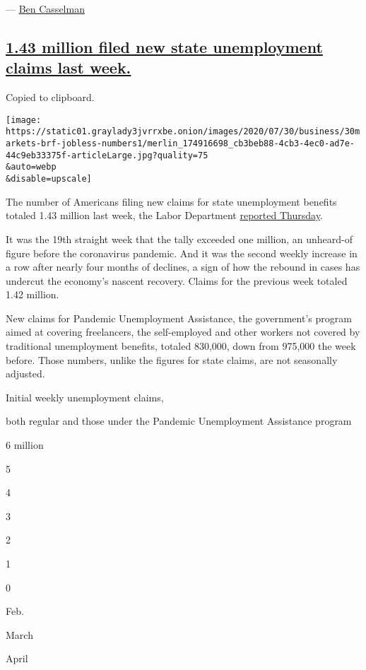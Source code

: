 --- \href{https://www.nytimes3xbfgragh.onion/by/ben-casselman}{Ben
Casselman}

\hypertarget{143-million-filed-new-state-unemployment-claims-last-week}{%
\subsection{\texorpdfstring{\protect\hyperlink{1-43-million-filed-new-state-unemployment-claims-last-week}{1.43
million filed new state unemployment claims last
week.}}{1.43 million filed new state unemployment claims last week.}}\label{143-million-filed-new-state-unemployment-claims-last-week}}

Copied to clipboard.

\texttt{[image: https://static01.graylady3jvrrxbe.onion/images/2020/07/30/business/30markets-brf-jobless-numbers1/merlin\_174916698\_cb3beb88-4cb3-4ec0-ad7e-44c9eb33375f-articleLarge.jpg?quality=75\\\&auto=webp\\\&disable=upscale]}

The number of Americans filing new claims for state unemployment
benefits totaled 1.43 million last week, the Labor Department
\href{https://oui.doleta.gov/press/2020/073020.pdf}{reported Thursday}.

It was the 19th straight week that the tally exceeded one million, an
unheard-of figure before the coronavirus pandemic. And it was the second
weekly increase in a row after nearly four months of declines, a sign of
how the rebound in cases has undercut the economy's nascent recovery.
Claims for the previous week totaled 1.42 million.

New claims for Pandemic Unemployment Assistance, the government's
program aimed at covering freelancers, the self-employed and other
workers not covered by traditional unemployment benefits, totaled
830,000, down from 975,000 the week before. Those numbers, unlike the
figures for state claims, are not seasonally adjusted.

Initial weekly unemployment claims,

both regular and those under the Pandemic Unemployment Assistance
program

6 million

5

4

3

2

1

0

Feb.

March

April

